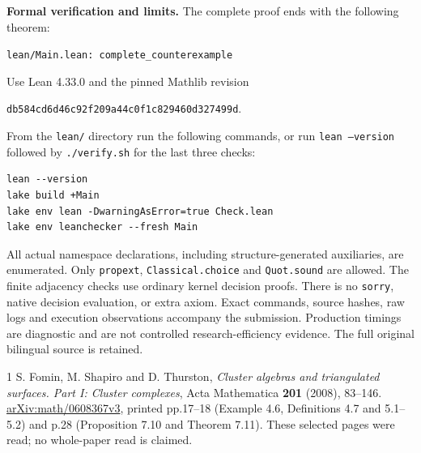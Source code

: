 \documentclass[10pt]{article}
\begin{document}
\textbf{Formal verification and limits.}
The complete proof ends with the following theorem:
\begin{center}\texttt{lean/Main.lean: complete\_counterexample}\end{center}
Use Lean 4.33.0 and the pinned Mathlib revision
\begin{center}\texttt{db584cd6d46c92f209a44c0f1c829460d327499d}.\end{center}
From the \texttt{lean/} directory run the following commands, or run
\texttt{lean --version} followed by \texttt{./verify.sh} for the last three checks:
\begin{verbatim}
lean --version
lake build +Main
lake env lean -DwarningAsError=true Check.lean
lake env leanchecker --fresh Main
\end{verbatim}
All actual namespace declarations, including structure-generated auxiliaries,
are enumerated. Only \texttt{propext}, \texttt{Classical.choice} and
\texttt{Quot.sound} are allowed. The finite adjacency checks use ordinary kernel
decision proofs. There is no \texttt{sorry}, native decision evaluation, or extra
axiom. Exact commands, source hashes, raw logs and execution observations accompany
the submission. Production timings are diagnostic and are not controlled
research-efficiency evidence. The full original bilingual source is retained.

\begin{thebibliography}{1}
S. Fomin, M. Shapiro and D. Thurston,
\emph{Cluster algebras and triangulated surfaces. Part I: Cluster complexes},
Acta Mathematica \textbf{201} (2008), 83--146.
\href{https://arxiv.org/pdf/math/0608367v3}{arXiv:math/0608367v3},
printed pp.17--18 (Example 4.6, Definitions 4.7 and 5.1--5.2) and p.28
(Proposition 7.10 and Theorem 7.11). These selected pages were read; no whole-paper
read is claimed.
\end{thebibliography}
\end{document}

